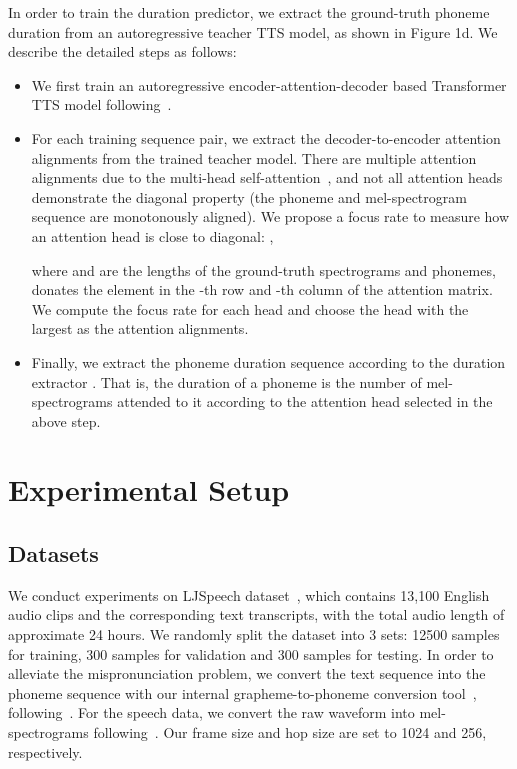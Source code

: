 \documentclass{article}
\begin{document}
In order to train the duration predictor, we extract the ground-truth phoneme duration from an autoregressive teacher TTS model, as shown in Figure 1d. We describe the detailed steps as follows:
\begin{itemize}
\item We first train an autoregressive encoder-attention-decoder based Transformer TTS model following~\citep{li2018close}.

\item For each training sequence pair, we extract the decoder-to-encoder attention alignments from the trained teacher model. There are multiple attention alignments due to the multi-head self-attention~\citep{vaswani2017attention}, and not all attention heads demonstrate the diagonal property (the phoneme and mel-spectrogram sequence are monotonously aligned). We propose a focus rate  to measure how an attention head is close to diagonal: ,

where  and  are the lengths of the ground-truth spectrograms and phonemes,  donates the element in the -th row and -th column of the attention matrix. We compute the focus rate for each head and choose the head with the largest  as the attention alignments. 

\item Finally, we extract the phoneme duration sequence  according to the duration extractor . That is, the duration of a phoneme is the number of mel-spectrograms attended to it according to the attention head selected in the above step.
\end{itemize}


\section{Experimental Setup}
\subsection{Datasets} 
We conduct experiments on LJSpeech dataset~\citep{ljspeech17}, which contains 13,100 English audio clips and the corresponding text transcripts, with the total audio length of approximate 24 hours. We randomly split the dataset into 3 sets: 12500 samples for training, 300 samples for validation and 300 samples for testing. In order to alleviate the mispronunciation problem, we convert the text sequence into the phoneme sequence with our internal grapheme-to-phoneme conversion tool~\citep{sun2019token}, following~\citep{arik2017deep,wang2017tacotron,shen2018natural}. For the speech data, we convert the raw waveform into mel-spectrograms following~\citep{shen2018natural}. Our frame size and hop size are set to 1024 and 256, respectively.
\end{document}
